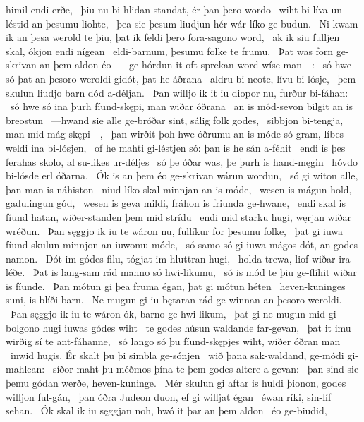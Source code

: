 himil endi erðe, \hld\ þiu nu bi-hlidan standat,
ér þan þero wordo \hld\ wiht bi-líva
un-léstid an þesumu liohte, \hld\ þea sie þesum liudjun hér
wár-líko ge-budun. \hld\ Ni kwam ik an þesa werold te þiu,
þat ik feldi þero fora-sagono word, \hld\ ak ik siu fulljen skal,
ókjon endi nígean \hld\ eldi-barnum,
þesumu folke te frumu. \hld\ Þat was forn ge-skrivan
an þem aldon éo \hld\ —ge hórdun it oft sprekan
word-wíse man—: \hld\ só hwe só þat an þesoro weroldi gidót,
þat he áðrana \hld\ aldru bi-neote,
lívu bi-lósje, \hld\ þem skulun liudjo barn
dód a-déljan. \hld\ Þan willjo ik it iu diopor nu,
furður bi-fáhan: \hld\ só hwe só ina þurh fíund-skępi,
man wiðar óðrana \hld\ an is mód-sevon
bilgit an is breostun \hld\ —hwand sie alle ge-bróðar sint,
sálig folk godes, \hld\ sibbjon bi-tengja,
man mid mág-skępi—, \hld\ þan wirðit þoh hwe óðrumu an is móde só gram,
líbes weldi ina bi-lósjen, \hld\ of he mahti gi-léstjen só:
þan is he sán a-féhit \hld\ endi is þes ferahas skolo,
al su-likes ur-déljes \hld\ só þe óðar was,
þe þurh is hand-męgin \hld\ hóvdo bi-lósde
erl óðarna. \hld\ Ók is an þem éo ge-skrivan
wárun wordun, \hld\ só gi witon alle,
þan man is náhiston \hld\ niud-líko skal
minnjan an is móde, \hld\ wesen is mágun hold,
gadulingun gód, \hld\ wesen is geva mildi,
fráhon is friunda ge-hwane, \hld\ endi skal is fíund hatan,
wiðer-standen þem mid strídu \hld\ endi mid starku hugi,
węrjan wiðar wréðun. \hld\ Þan sęggjo ik iu te wáron nu,
fullíkur for þesumu folke, \hld\ þat gi iuwa fíund skulun
minnjon an iuwomu móde, \hld\ só samo só gi iuwa mágos dót,
an godes namon. \hld\ Dót im gódes filu,
tógjat im hluttran hugi, \hld\ holda trewa,
liof wiðar ira léðe. \hld\ Þat is lang-sam rád
manno só hwi-likumu, \hld\ só is mód te þiu
ge-flíhit wiðar is fíunde. \hld\ Þan mótun gi þea fruma égan,
þat gi mótun héten \hld\ heven-kuninges suni,
is blíði barn. \hld\ Ne mugun gi iu bętaran rád
ge-winnan an þesoro weroldi. \hld\ Þan sęggjo ik iu te wáron ók,
barno ge-hwi-likum, \hld\ þat gi ne mugun mid gi-bolgono hugi
iuwas gódes wiht \hld\ te godes húsun
waldande far-gevan, \hld\ þat it imu wirðig sí
te ant-fáhanne, \hld\ só lango só þu fíund-skępjes wiht,
wiðer óðran man \hld\ inwid hugis.
Ér skalt þu þi simbla ge-sónjen \hld\ wið þana sak-waldand,
ge-módi gi-mahlean: \hld\ síðor maht þu méðmos þína
te þem godes altere a-gevan: \hld\ þan sind sie þemu gódan werðe,
heven-kuninge. \hld\ Mér skulun gi aftar is huldi þionon,
godes willjon ful-gán, \hld\ þan óðra Judeon duon,
ef gi willjat égan \hld\ éwan ríki,
sin-líf sehan. \hld\ Ók skal ik iu sęggjan noh,
hwó it þar an þem aldon \hld\ éo ge-biudid,
